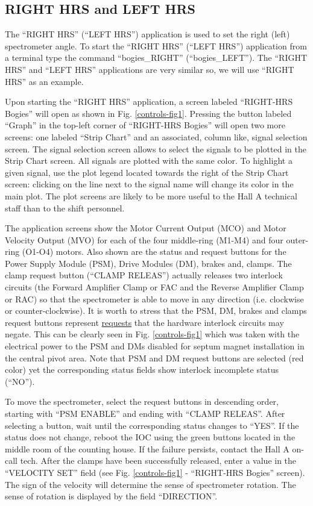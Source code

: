 {\subsection{RIGHT HRS and LEFT HRS}
The ``RIGHT HRS'' (``LEFT HRS'') application is used to set the right (left)
spectrometer angle.
To start the ``RIGHT HRS'' (``LEFT HRS'')
application from a terminal type the command ``bogies\_RIGHT'' (``bogies\_LEFT'').
The ``RIGHT HRS'' and ``LEFT HRS'' applications are very similar so, we will
use ``RIGHT HRS'' as an example.

Upon starting the ``RIGHT HRS'' application, 
a screen labeled ``RIGHT-HRS Bogies'' will open as shown in
Fig. \ref{controls-fig1}.
Pressing the button labeled ``Graph'' in the top-left corner of ``RIGHT-HRS Bogies''
will open two more screens: one labeled ``Strip Chart'' and an associated, column like,
signal selection screen. The signal selection screen allows to select the signals
to be plotted in the Strip Chart screen. All signals are plotted with the same color.
To highlight a given signal,
use the plot legend located towards the right of the Strip Chart screen: clicking on the line next
to the signal name will change its color in the main plot.
The plot screens are likely to be more useful to the Hall A technical staff than to the
shift personnel.

The application screens show the Motor Current Output (MCO) and Motor Velocity Output (MVO) for each
of the four middle-ring (M1-M4) and four outer-ring (O1-O4) motors.
Also shown are the status and request buttons for the Power Supply Module (PSM),
Drive Modules (DM),
brakes and, clamps. The clamp request button (``CLAMP RELEAS'') actually releases two interlock
circuits (the Forward Amplifier Clamp or FAC and the Reverse Amplifier Clamp or RAC)
so that the spectrometer is
able to move in any direction (i.e. clockwise or counter-clockwise).
It is worth to stress that the PSM, DM, brakes and clamps request buttons represent
\underline{requests} that the hardware interlock circuits may negate. This can be clearly
seen 
in Fig. \ref{controls-fig1} which was taken with
the electrical power to the PSM and DMs disabled for septum magnet installation
in the central pivot area. Note that PSM and DM request buttons are selected (red color)
yet the corresponding status fields show interlock incomplete status (``NO'').

To move the spectrometer, select the request buttons in descending order, starting with
``PSM ENABLE'' and ending with ``CLAMP RELEAS''. After selecting a button, wait
until the corresponding status changes to ``YES''. 
If the status does not change, reboot
the IOC using the green buttons located in the middle room of the counting house.
If the failure persists, contact the Hall A on-call tech.
After the clamps have been successfully released, enter a value in the ``VELOCITY SET'' field
(see Fig. \ref{controls-fig1} - ``RIGHT-HRS Bogies'' screen). The sign of the velocity
will determine the sense of spectrometer rotation. The sense of rotation is displayed by the
field ``DIRECTION''.

}
